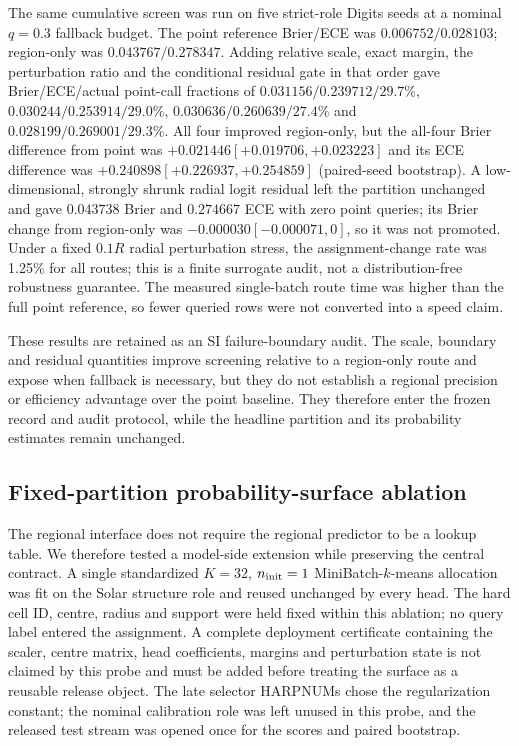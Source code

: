 \documentclass[11pt,a4paper]{article}
\numberwithin{equation}{section}
\theoremstyle{definition}\newtheorem{definition}[theorem]{Definition}
\theoremstyle{remark}\newtheorem{remark}[theorem]{Remark}
\begin{document}
The same cumulative screen was run on five strict-role Digits seeds at a nominal $q=0.3$ fallback budget. The point reference Brier/ECE was $0.006752/0.028103$; region-only was $0.043767/0.278347$. Adding relative scale, exact margin, the perturbation ratio and the conditional residual gate in that order gave Brier/ECE/actual point-call fractions of $0.031156/0.239712/29.7\%$, $0.030244/0.253914/29.0\%$, $0.030636/0.260639/27.4\%$ and $0.028199/0.269001/29.3\%$. All four improved region-only, but the all-four Brier difference from point was $+0.021446[+0.019706,+0.023223]$ and its ECE difference was $+0.240898[+0.226937,+0.254859]$ (paired-seed bootstrap). A low-dimensional, strongly shrunk radial logit residual left the partition unchanged and gave $0.043738$ Brier and $0.274667$ ECE with zero point queries; its Brier change from region-only was $-0.000030[-0.000071,0]$, so it was not promoted. Under a fixed $0.1R$ radial perturbation stress, the assignment-change rate was 1.25\% for all routes; this is a finite surrogate audit, not a distribution-free robustness guarantee. The measured single-batch route time was higher than the full point reference, so fewer queried rows were not converted into a speed claim.

These results are retained as an SI failure-boundary audit. The scale, boundary and residual quantities improve screening relative to a region-only route and expose when fallback is necessary, but they do not establish a regional precision or efficiency advantage over the point baseline. They therefore enter the frozen record and audit protocol, while the headline partition and its probability estimates remain unchanged.

\subsection{Fixed-partition probability-surface ablation}
\label{sec:ballsurface}

The regional interface does not require the regional predictor to be a lookup table. We therefore tested a model-side extension while preserving the central contract. A single standardized $K=32$, $n_{\rm init}=1$ MiniBatch-$k$-means allocation was fit on the Solar structure role and reused unchanged by every head. The hard cell ID, centre, radius and support were held fixed within this ablation; no query label entered the assignment. A complete deployment certificate containing the scaler, centre matrix, head coefficients, margins and perturbation state is not claimed by this probe and must be added before treating the surface as a reusable release object. The late selector HARPNUMs chose the regularization constant; the nominal calibration role was left unused in this probe, and the released test stream was opened once for the scores and paired bootstrap.
\end{document}

